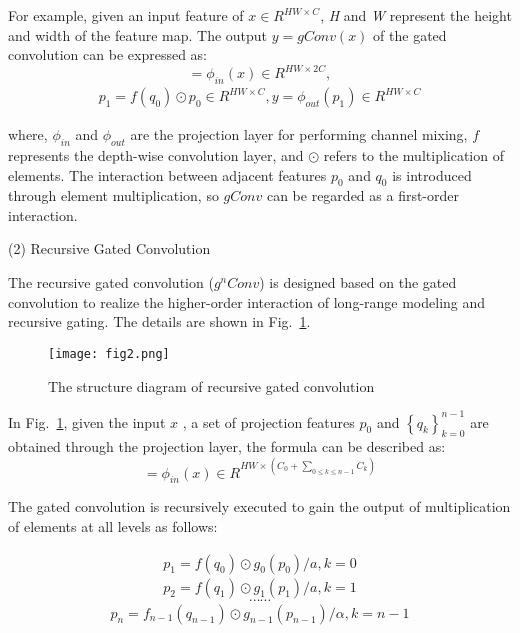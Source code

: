 \documentclass[sn-mathphys,Numbered]{sn-jnl}%
\theoremstyle{thmstyleone}%
\theoremstyle{thmstyletwo}%
\theoremstyle{thmstylethree}%
\begin{document}
For example, given an input feature of $x \in {R^{HW \times C}}$, \emph{H} and \emph{W} represent the height and width of the feature map. The output $y = gConv\left( x \right)$ of the gated convolution can be expressed as:
\begin{equation}
[p_0^{HW \times C},q_0^{HW \times C}] = {\phi _{in}}(x) \in {R^{HW \times 2C}},
\end{equation}
\begin{align}
{p_1} = f\left( {{q_0}} \right) \odot {p_0} \in {R^{HW \times C}},y = {\phi _{out}}({p_1}) \in {R^{HW \times C}}
\end{align}

where, ${\phi _{in}}$ and ${\phi _{out}}$ are the projection layer for performing channel mixing, $f$ represents the depth-wise convolution layer, and $ \odot $ refers to the multiplication of elements. The interaction between adjacent features ${p_0}$ and ${{q_0}}$ is introduced through element multiplication, so $gConv$ can be regarded as a first-order interaction.

(2) Recursive Gated Convolution

The recursive gated convolution (${g^n}Conv$) is designed based on the gated convolution to realize the higher-order interaction of long-range modeling and recursive gating. The details are shown in Fig.~\ref{fig2}.

\begin{figure}[h]%
\centering
\texttt{[image: fig2.png]}
\caption{The structure diagram of recursive gated convolution}\label{fig2}
\end{figure}

In Fig.~\ref{fig2}, given the input $x$ , a set of projection features ${p_0}$ and $\left\{ {{q_k}} \right\}_{k = 0}^{n - 1}$ are obtained through the projection layer, the formula can be described as:
\begin{equation}
[p_0^{HW \times {C_0}},q_0^{HW \times {C_0}},...,q_{n - 1}^{HW \times {C_{n - 1}}}] = {\phi _{in}}(x) \in {R^{HW \times ({C_0} + \sum\nolimits_{0 \le k \le n - 1} {{C_k}} )}}
\end{equation}

The gated convolution is recursively executed to gain the output of multiplication of elements at all levels as follows:

\begin{align}
{p_1} = f({q_0}) \odot {g_0}({p_0})/a,    k = 0 
\end{align} 
\begin{equation}
{p_2} = f({q_1}) \odot {g_1}({p_1})/a,    k = 1 
\end{equation}
\begin{equation}
\cdots  \cdots \nonumber
\end{equation}
\begin{equation}
{p_n} = {f_{n - 1}}({q_{n - 1}}) \odot {g_{n - 1}}({p_{n - 1}})/\alpha ,   k = n - 1 
\end{equation}
\end{document}
